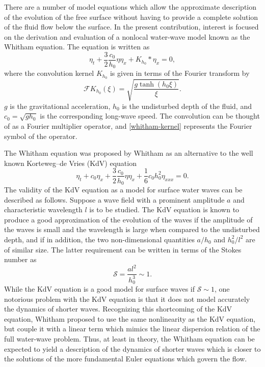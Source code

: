 There are a number of model equations which allow the
approximate description of the evolution of the free surface
without having to provide a complete solution of the fluid flow
below the surface. In the present contribution, interest is focused
on the derivation and evaluation of a nonlocal water-wave model
known as the Whitham equation. The equation is written as
%
\begin{equation}
	\eta_t + \frac{3}{2} \frac{c_0}{h_0} \eta \eta_x + K_{h_0} \ast \eta_x = 0, 
	\label{whitham-equation}
\end{equation}
%
where the convolution kernel $K_{h_0}$ is given in terms of the Fourier
transform by
%
\begin{equation}
	\mathcal{F}K_{h_0} (\xi) =  \sqrt{\frac{g \tanh(h_0\xi)}{\xi}}.
	\label{whitham-kernel}
\end{equation}
%
$g$ is the gravitational acceleration, $h_0$ is the undisturbed depth of
the fluid, and $c_0 = \sqrt{gh_0}$ is the corresponding long-wave speed.
The convolution can be thought of as a Fourier multiplier operator,
and \eqref{whitham-kernel} represents the Fourier symbol of the operator.


The Whitham equation was proposed by Whitham \cite{Whitham1967} as an
alternative to the well known Korteweg–de Vries (KdV) equation
%
\begin{equation}
	\eta_t + c_0 \eta_x + \frac{3}{2} \frac{c_0}{h_0} \eta \eta_x + \frac{1}{6} c_0 h_0^2 		\eta_{xxx} = 0.
	\label{kdv-equation}
\end{equation}
%
The validity of the KdV equation as a model for surface water waves
can be described as follows. Suppose a wave field with a prominent
amplitude $a$ and characteristic wavelength $l$ is to be studied. The
KdV equation is known to produce a good approximation of the
evolution of the waves if the amplitude of the waves is small and
the wavelength is large when compared to the undisturbed depth,
and if in addition, the two non-dimensional quantities $a / h_0$ and
$h_0^2 / l^2$ are of similar size. The latter requirement can be written in
terms of the Stokes number as
%
\begin{equation}
\mathcal{S} = \frac{a l^2}{h_0^3} \sim 1. 
\label{stockes-number}
\end{equation}
%
While the KdV equation is a good model for surface waves if $\mathcal{S} \sim 1$, 
one notorious problem with the KdV equation is that it does
not model accurately the dynamics of shorter waves. Recognizing
this shortcoming of the KdV equation, Whitham proposed to use
the same nonlinearity as the KdV equation, but couple it with a
linear term which mimics the linear dispersion relation of the full
water-wave problem. Thus, at least in theory, the Whitham
equation can be expected to yield a description of the dynamics
of shorter waves which is closer to the solutions of the more
fundamental Euler equations which govern the flow.


